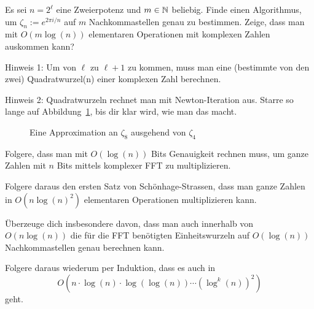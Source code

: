 \begin{sheet}
    \begin{problem}
        Es sei $n=2^\ell$ eine Zweierpotenz und $m\in\mathbb{N}$ beliebig. Finde einen Algorithmus, um $\zeta_n:=e^{2\pi i/n}$ auf $m$ Nachkommastellen genau zu bestimmen. Zeige, dass man mit $O(m\log(n))$ elementaren Operationen mit komplexen Zahlen auskommen kann?

        \smallskip
        Hinweis 1: Um von $\ell$ zu $\ell+1$ zu kommen, muss man eine (bestimmte von den zwei) Quadratwurzel(n) einer komplexen Zahl berechnen.

        Hinweis 2: Quadratwurzeln rechnet man mit Newton-Iteration aus. Starre so lange auf Abbildung~\ref{fig:fft:approximation_zeta_8}, bis dir klar wird, wie man das macht.

        \begin{figure}[ht]
            \centering
            \caption{Eine Approximation an $\zeta_8$ ausgehend von $\zeta_4$}
            \label{fig:fft:approximation_zeta_8}
        \end{figure}
    \end{problem}

    \begin{problem}[title={Schönhage-Strassen I}]
        \begin{subproblem}
            Folgere, dass man mit $O(\log(n))$ Bits Genauigkeit rechnen muss, um ganze Zahlen mit $n$ Bits mittels komplexer FFT zu multiplizieren.
        \end{subproblem}
        \begin{subproblem}
            Folgere daraus den ersten Satz von Schönhage-Strassen, dass man ganze Zahlen in $O(n\log(n)^2)$ elementaren Operationen multiplizieren kann.

            Überzeuge dich insbesondere davon, dass man auch innerhalb von $O(n\log(n))$ die für die FFT benötigten Einheitswurzeln auf $O(\log(n))$ Nachkommastellen genau berechnen kann.
        \end{subproblem}
        \begin{subproblem}
            Folgere daraus wiederum per Induktion, dass es auch in
            \[O(n\cdot\log(n)\cdot \log(\log(n)) \cdots (\log^k(n))^2)\]
            geht.
        \end{subproblem}
    \end{problem}
\end{sheet}